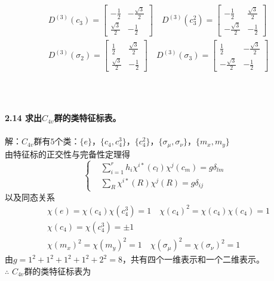 \documentclass[12pt]{article}
\numberwithin{equation}{section}	 %
\begin{document}
\begin{spacing}{1.5}
\begin{align*}
&D^{(3)}(c_{3}) = \begin{bmatrix} -\frac{1}{2} & -\frac{\sqrt{3}}{2} \\ \frac{\sqrt{3}}{2} & -\frac{1}{2} \end{bmatrix} \quad D^{(3)}(c_{3}^{2}) = \begin{bmatrix} -\frac{1}{2} & \frac{\sqrt{3}}{2} \\ -\frac{\sqrt{3}}{2} & -\frac{1}{2} \end{bmatrix} \\
&D^{(3)}(\sigma_{2}) = \begin{bmatrix} \frac{1}{2} & \frac{\sqrt{3}}{2} \\ \frac{\sqrt{3}}{2} & -\frac{1}{2} \end{bmatrix} \quad D^{(3)}(\sigma_{3}) = \begin{bmatrix} \frac{1}{2} & -\frac{\sqrt{3}}{2} \\ -\frac{\sqrt{3}}{2} & -\frac{1}{2} \end{bmatrix} \\
\end{align*}
~\\
~\\
~\\
\textbf{2.14 \quad 求出$C_{4v}$群的类特征标表。}\\
~\\
解：$C_{4v}$群有$5$个类：$\{e\}$，$\{c_{4},c_{4}^{3}\}$，$\{c_{4}^{2}\}$，$\{\sigma_{\mu},\sigma_{\nu}\}$，$\{m_{x},m_{y}\}$ \\
由特征标的正交性与完备性定理得
\begin{equation}
\left\{
\begin{aligned}
&\sum_{i=1}^{r}h_{i} \chi^{i*}(c_{l})\chi^{j}(c_{m}) = g\delta_{lm}\\
&\sum_{R} \chi^{i*}(R)\chi^{j}(R) = g\delta_{ij}
\end{aligned}
\right.
\end{equation}
以及同态关系
\begin{align*}
&\chi(e) = \chi(c_{4})\chi(c_{4}^{3}) = 1 \quad \chi(c_{4})^{2} = \chi(c_{4})\chi(c_{4}) = 1\\
&\chi(c_{4}) = \chi(c_{4}^{3}) = \pm1 \\
&\chi(m_{x})^{2} = \chi(m_{y})^{2} = 1 \quad \chi(\sigma_{\mu})^{2} = \chi(\sigma_{\nu})^{2} = 1
\end{align*}
由$g = 1^{2} + 1^{2} + 1^{2} + 1^{2} + 2^{2} = 8$，共有四个一维表示和一个二维表示。\\
$\therefore$ $C_{4v}$群的类特征标表为 \\

\end{spacing}
\end{document}
